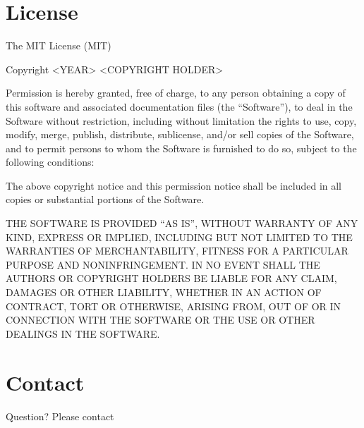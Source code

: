 \documentclass[letterpaper,10pt,english]{sphinxmanual}
\begin{document}
\section{License}
\label{\detokenize{license:license}}\label{\detokenize{license::doc}}
The MIT License (MIT)

Copyright \textless{}YEAR\textgreater{} \textless{}COPYRIGHT HOLDER\textgreater{}

Permission is hereby granted, free of charge, to any person obtaining a copy of this software and associated documentation files (the “Software”), to deal in the Software without restriction, including without limitation the rights to use, copy, modify, merge, publish, distribute, sublicense, and/or sell copies of the Software, and to permit persons to whom the Software is furnished to do so, subject to the following conditions:

The above copyright notice and this permission notice shall be included in all copies or substantial portions of the Software.

THE SOFTWARE IS PROVIDED “AS IS”, WITHOUT WARRANTY OF ANY KIND, EXPRESS OR IMPLIED, INCLUDING BUT NOT LIMITED TO THE WARRANTIES OF MERCHANTABILITY, FITNESS FOR A PARTICULAR PURPOSE AND NONINFRINGEMENT. IN NO EVENT SHALL THE AUTHORS OR COPYRIGHT HOLDERS BE LIABLE FOR ANY CLAIM, DAMAGES OR OTHER LIABILITY, WHETHER IN AN ACTION OF CONTRACT, TORT OR OTHERWISE, ARISING FROM, OUT OF OR IN CONNECTION WITH THE SOFTWARE OR THE USE OR OTHER DEALINGS IN THE SOFTWARE.


\section{Contact}
\label{\detokenize{license:contact}}
Question? Please contact 



\renewcommand{\indexname}{Index}
\printindex
\end{document}
